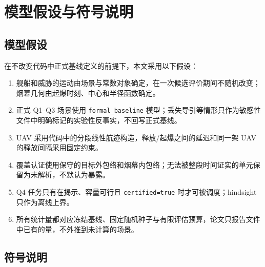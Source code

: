 \section{模型假设与符号说明}

\subsection{模型假设}

在不改变代码中正式基线定义的前提下，本文采用以下假设：

\begin{enumerate}
  \item 舰船和威胁的运动由场景与常数对象确定，在一次候选评价期间不随机改变；烟幕几何由起爆时刻、中心和半径函数确定。
  \item 正式 Q1--Q3 场景使用 \texttt{formal\_baseline} 模型；丢失导引等情形只作为敏感性文件中明确标记的实验性反事实，不回写正式基线。
  \item UAV 采用代码中的分段线性航迹构造，释放/起爆之间的延迟和同一架 UAV 的释放间隔采用固定约束。
  \item 覆盖认证使用保守的目标外包络和烟幕内包络；无法被整段时间证实的单元保留为未解析，不默认为暴露。
  \item Q4 任务只有在揭示、容量可行且 \texttt{certified=true} 时才可被调度；hindsight 只作为离线上界。
  \item 所有统计量都对应冻结基线、固定随机种子与有限评估预算，论文只报告文件中已有的量，不外推到未计算的场景。
\end{enumerate}

\subsection{符号说明}

